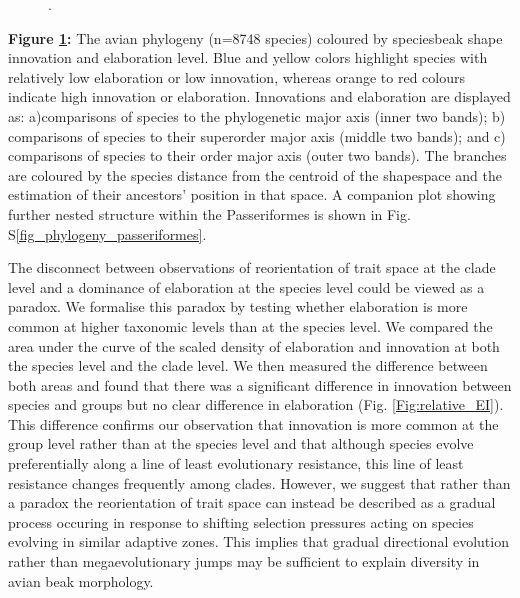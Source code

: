 \documentclass[12pt,letterpaper]{article}
\begin{document}
\begin{figure}[!htbp]
\centering
\caption{.}
\label{Fig:phylogeny}
\end{figure}
\noindent \textbf{Figure \ref{Fig:phylogeny}:} The avian phylogeny (n=8748 species) coloured by speciesbeak shape innovation and elaboration level.
Blue and yellow colors highlight species with relatively low elaboration or low innovation, whereas orange to red colours indicate high innovation or elaboration.
Innovations and elaboration are displayed as: a)comparisons of species to the phylogenetic major axis (inner two bands); b) comparisons of species to their superorder major axis (middle two bands); and c) comparisons of species to their order major axis (outer two bands).
The branches are coloured by the species distance from the centroid of the shapespace and the estimation of their ancestors' position in that space.
A companion plot showing further nested structure within the Passeriformes is shown in Fig. S\ref{fig_phylogeny_passeriformes}.

The disconnect between observations of reorientation of trait space at the clade level and a dominance of elaboration at the species level could be viewed as a paradox.
We formalise this paradox by testing whether elaboration is more common at higher taxonomic levels than at the species level.
We compared the area under the curve of the scaled density of elaboration and innovation at both the species level and the clade level.
We then measured the difference between both areas and found that there was a significant difference in innovation between species and groups but no clear difference in elaboration (Fig. \ref{Fig:relative_EI}).
This difference confirms our observation that innovation is more common at the group level rather than at the species level and that although species evolve preferentially along a line of least evolutionary resistance, this line of least resistance changes frequently among clades.
However, we suggest that rather than a paradox the reorientation of trait space can instead be described as a gradual process occuring in response to shifting selection pressures acting on species evolving in similar adaptive zones.
This implies that gradual directional evolution \cite{pagel2022general} rather than megaevolutionary jumps \cite{cooney2017mega,venditti2011multiple} may be sufficient to explain diversity in avian beak morphology.
\end{document}
